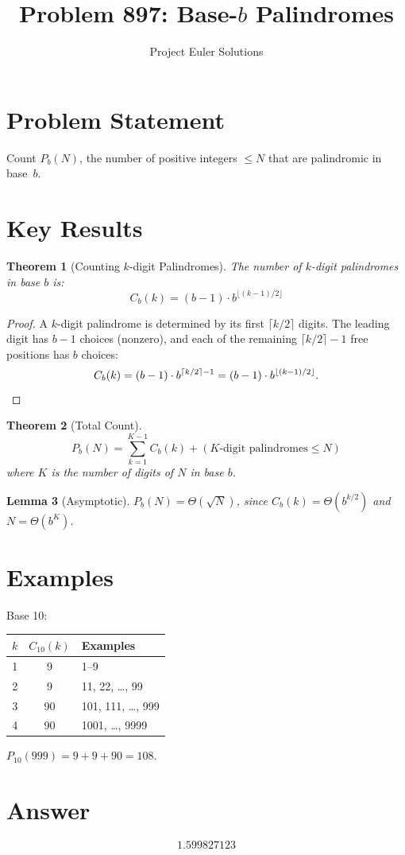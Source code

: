 \documentclass[11pt]{article}
\title{Problem 897: Base-$b$ Palindromes}
\author{Project Euler Solutions}
\date{}
\newtheorem{theorem}{Theorem}
\newtheorem{lemma}[theorem]{Lemma}
\begin{document}
\maketitle

\section{Problem Statement}
Count $P_b(N)$, the number of positive integers $\le N$ that are palindromic in base~$b$.

\section{Key Results}

\begin{theorem}[Counting $k$-digit Palindromes]
The number of $k$-digit palindromes in base $b$ is:
\[
C_b(k) = (b-1) \cdot b^{\lfloor(k-1)/2\rfloor}
\]
\end{theorem}

\begin{proof}
A $k$-digit palindrome is determined by its first $\lceil k/2 \rceil$ digits. The leading digit has $b-1$ choices (nonzero), and each of the remaining $\lceil k/2 \rceil - 1$ free positions has $b$ choices:
\[
C_b(k) = (b-1) \cdot b^{\lceil k/2 \rceil - 1} = (b-1) \cdot b^{\lfloor(k-1)/2\rfloor}. \qedhere
\]
\end{proof}

\begin{theorem}[Total Count]
\[
P_b(N) = \sum_{k=1}^{K-1} C_b(k) + (\text{$K$-digit palindromes} \le N)
\]
where $K$ is the number of digits of $N$ in base $b$.
\end{theorem}

\begin{lemma}[Asymptotic]
$P_b(N) = \Theta(\sqrt{N})$, since $C_b(k) = \Theta(b^{k/2})$ and $N = \Theta(b^K)$.
\end{lemma}

\section{Examples}

Base 10:
\begin{center}
\begin{tabular}{c|c|l}
$k$ & $C_{10}(k)$ & Examples \\ \hline
1 & 9 & 1--9 \\
2 & 9 & 11, 22, \ldots, 99 \\
3 & 90 & 101, 111, \ldots, 999 \\
4 & 90 & 1001, \ldots, 9999
\end{tabular}
\end{center}

$P_{10}(999) = 9 + 9 + 90 = 108$.

\section{Answer}

\[
\boxed{1.599827123}
\]
\end{document}
